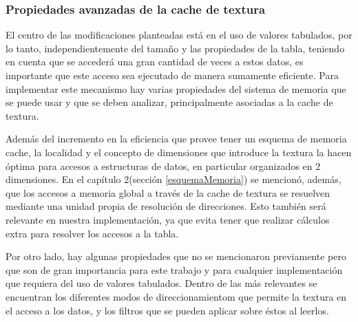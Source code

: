 \subsubsection{Propiedades avanzadas de la cache de textura} \label{texturaDetallado}

El centro de las modificaciones planteadas está en el uso de valores tabulados, por lo tanto, independientemente del tamaño y las propiedades de la tabla, teniendo en cuenta que se accederá una gran cantidad de veces a estos datos, 
es importante que este acceso sea ejecutado de manera sumamente eficiente.
Para implementar este mecanismo hay varias propiedades del sistema de memoria que se puede usar y que se deben analizar, principalmente asociadas a la cache de textura. 

Además del incremento en la eficiencia que provee tener un esquema de memoria cache, la localidad y el concepto de dimensiones que introduce la textura la hacen óptima para accesos a estructuras de datos, 
en particular organizados en 2 dimensiones. En el capítulo 2(sección \ref{esquemaMemoria}) se mencionó, además, que los accesos a memoria global a través de la cache de textura se resuelven mediante una unidad propia de resoluci\'on de direcciones. 
Esto también será relevante en nuestra implementación, ya que evita tener que realizar cálculos extra para resolver los accesos a la tabla.

Por otro lado, hay algunas propiedades que no se mencionaron previamente pero que son de gran importancia para este trabajo y para cualquier implementación que requiera del uso de valores tabulados. 
Dentro de las más relevantes se encuentran los diferentes modos de direccionamientom que permite la textura en el acceso a los datos, y los filtros que se pueden aplicar sobre éstos al leerlos. 

